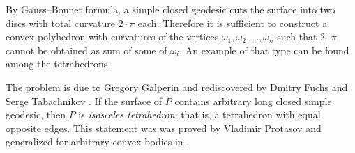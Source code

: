 By Gauss--Bonnet formula, a simple closed geodesic cuts the surface into two discs with total curvature $2\cdot\pi$ each.
Therefore it is sufficient to construct a convex polyhedron with curvatures of the vertices $\omega_1,\omega_2,\dots,\omega_n$ such that
$2\cdot\pi$ cannot be obtained as sum of some of $\omega_i$.
An example of that type can be found among the tetrahedrons.
\qeds

The problem is due to Gregory Galperin \cite[see][]{galperin} 
and rediscovered by Dmitry Fuchs and Serge Tabachnikov \cite[see 20.8 in][]{fuchs-tabachnikov}.
If the surface of $P$ contains arbitrary long closed simple geodesic, 
then $P$ is \emph{isosceles tetrahedron};
that is, a tetrahedron with equal opposite edges.
This statement was was proved by Vladimir Protasov \cite[see][]{protasov}
and generalized for arbitrary convex bodies in \cite{akopyan-petrunin}.

